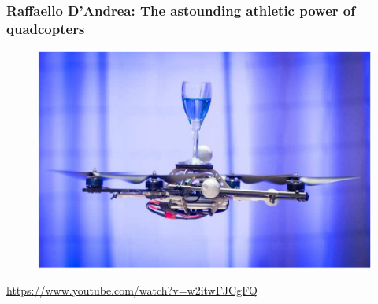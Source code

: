 \documentclass{beamer}
\begin{document}
\begin{frame}
\frametitle{Raffaello D'Andrea: The astounding athletic power of quadcopters}
\begin{figure}
\includegraphics[scale=.6]{quadcopter}
\end{figure}
\url{https://www.youtube.com/watch?v=w2itwFJCgFQ}
\end{frame}

\end{document}
